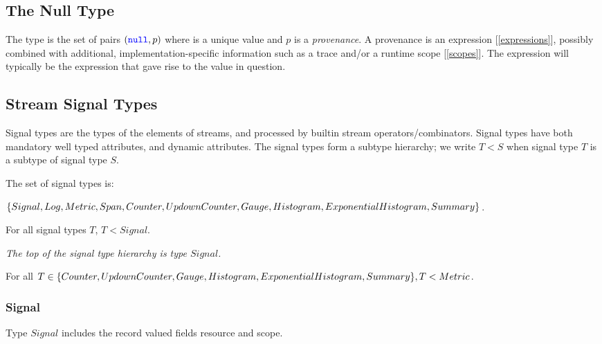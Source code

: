 \documentclass{article}
\begin{document}
{

\subsection{The Null Type}
\label{theNullType}

The type \NULLTYPE is the set of pairs $(\texttt{\color{blue} null}, p)$ where \NULL{} is a unique value and $p$ is a {\em provenance}.  A provenance is an expression [\ref{expressions}], possibly combined with additional, implementation-specific information such as a trace and/or a runtime scope [\ref{scopes}]. The expression will typically be the expression  that gave rise to the \NULL{} value in question. 


\subsection{Stream Signal Types}
\label{streamSignalTypes}

Signal types are the types of the elements of streams, and processed by builtin stream operators/combinators. Signal types have both mandatory well typed attributes, and dynamic attributes.  The signal types form a subtype  hierarchy; we write $ T < S$ when signal type $T$ is  a subtype of signal type $S$.

The set of signal types is:

 $\{Signal, Log, Metric, Span,  
Counter, UpdownCounter, Gauge, Histogram, \\ ExponentialHistogram, Summary\}$.

For all signal types $T$, $T < Signal$.

{\em The top of the signal type hierarchy is type $Signal$.}

For all $T \in \{Counter, UpdownCounter, Gauge, Histogram, ExponentialHistogram, Summary\}, \\ T < Metric$.

\subsubsection{Signal}
\label{signal}

Type $Signal$ includes the record valued fields resource and scope.

 
}
\end{document}
